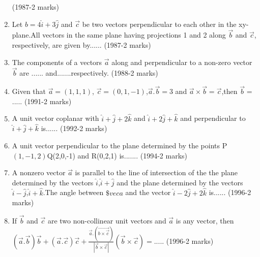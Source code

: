 \documentclass[journal,12pt,twocolumn]{IEEEtran}
\theoremstyle{remark}
\begin{document}
\begin{enumerate}
\hfill{(1987-2 marks)}
\item Let $b=4\hat{i}+3\hat{j}$ and $\vec{c}$ be two vectors perpendicular to each other in the xy-plane.All vectors in the same plane having projections 1 and 2 along $\vec{b}$ and $\vec{c}$, respectively, are given by......
\hfill{(1987-2 marks)}
\item The components of a vectors $\vec{a}$ along and  perpendicular to a non-zero vector $\vec{b}$ are ...... and.......respectively.
\hfill{(1988-2 marks)}
\item Given that $\vec{a}=(1,1,1)$, $\vec{c}=(0,1,-1)$,$\vec{a}.\vec{b}=3$ and $\vec{a}\times\vec{b}=\vec{c}$,then $\vec{b}=$.....
\hfill{(1991-2 marks)}
\item A unit vector coplanar with $\hat{i}+\hat{j}+2\hat{k}$ and $\hat{i}+2\hat{j}+\hat{k}$ and perpendicular to $\hat{i}+\hat{j}+\hat{k}$ is......
\hfill{(1992-2 marks)}
\item A unit vector perpendicular to the plane determined by the points P$(1,-1,2)$Q(2,0,-1) and R(0,2,1) is.......
\hfill{(1994-2 marks)}
\item A nonzero vector $\vec{a}$ is parallel to the line of intersection of the the plane determined by the vectors $\hat{i}$,$\hat{i}+\hat{j}$ and the plane determined by the vectors $\hat{i}-\hat{j}$,$\hat{i}+\hat{k}$.The angle between $\$vec{a}$ and the vector $\hat{i}-2\hat{j}+2\hat{k}$ is......
\hfill{(1996-2 marks)}
\item If $\vec{b}$ and $\vec{c}$ are two non-collinear unit vectors and $\vec{a}$ is any vector, then $(\vec{a}.\vec{b})\vec{b}+(\vec{a}.\vec{c})\vec{c}+\frac{\vec{a}.(\vec{b\times\vec{c}})}{|\vec{b}\times\vec{c}|}(\vec{b}\times\vec{c})=$.....
\hfill{(1996-2 marks)}
\end{enumerate}
\end{document}
